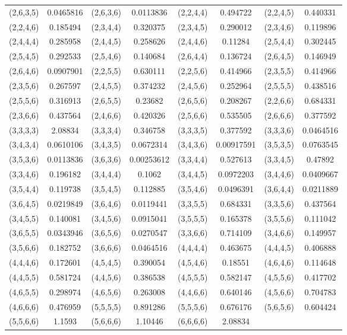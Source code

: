 \documentclass[hidelinks]{ctexart}
\begin{document}
\begin{longtable}{cccccccc}
(2,6,3,5) & 
0.0465816
 & 
(2,6,3,6) & 
0.0113836
 & 
(2,2,4,4) & 
0.494722
 & 
(2,2,4,5) & 
0.440331
\\
(2,2,4,6) & 
0.185494
 & 
(2,3,4,4) & 
0.320375
 & 
(2,3,4,5) & 
0.290012
 & 
(2,3,4,6) & 
0.119896
\\
(2,4,4,4) & 
0.285958
 & 
(2,4,4,5) & 
0.258626
 & 
(2,4,4,6) & 
0.11284
 & 
(2,5,4,4) & 
0.302445
\\
(2,5,4,5) & 
0.292533
 & 
(2,5,4,6) & 
0.140684
 & 
(2,6,4,4) & 
0.136724
 & 
(2,6,4,5) & 
0.146949
\\
(2,6,4,6) & 
0.0907901
 & 
(2,2,5,5) & 
0.630111
 & 
(2,2,5,6) & 
0.414966
 & 
(2,3,5,5) & 
0.414966
\\
(2,3,5,6) & 
0.267597
 & 
(2,4,5,5) & 
0.374232
 & 
(2,4,5,6) & 
0.252964
 & 
(2,5,5,5) & 
0.438516
\\
(2,5,5,6) & 
0.316913
 & 
(2,6,5,5) & 
0.23682
 & 
(2,6,5,6) & 
0.208267
 & 
(2,2,6,6) & 
0.684331
\\
(2,3,6,6) & 
0.437564
 & 
(2,4,6,6) & 
0.420326
 & 
(2,5,6,6) & 
0.535505
 & 
(2,6,6,6) & 
0.377592
\\
(3,3,3,3) & 
2.08834
 & 
(3,3,3,4) & 
0.346758
 & 
(3,3,3,5) & 
0.377592
 & 
(3,3,3,6) & 
0.0464516
\\
(3,4,3,4) & 
0.0610106
 & 
(3,4,3,5) & 
0.0672314
 & 
(3,4,3,6) & 
0.00917591
 & 
(3,5,3,5) & 
0.0763545
\\
(3,5,3,6) & 
0.0113836
 & 
(3,6,3,6) & 
0.00253612
 & 
(3,3,4,4) & 
0.527613
 & 
(3,3,4,5) & 
0.47892
\\
(3,3,4,6) & 
0.196182
 & 
(3,4,4,4) & 
0.1062
 & 
(3,4,4,5) & 
0.0972203
 & 
(3,4,4,6) & 
0.0409667
\\
(3,5,4,4) & 
0.119738
 & 
(3,5,4,5) & 
0.112885
 & 
(3,5,4,6) & 
0.0496391
 & 
(3,6,4,4) & 
0.0211889
\\
(3,6,4,5) & 
0.0219849
 & 
(3,6,4,6) & 
0.0119441
 & 
(3,3,5,5) & 
0.684331
 & 
(3,3,5,6) & 
0.437564
\\
(3,4,5,5) & 
0.140081
 & 
(3,4,5,6) & 
0.0915041
 & 
(3,5,5,5) & 
0.165378
 & 
(3,5,5,6) & 
0.111042
\\
(3,6,5,5) & 
0.0343946
 & 
(3,6,5,6) & 
0.0270547
 & 
(3,3,6,6) & 
0.714109
 & 
(3,4,6,6) & 
0.149957
\\
(3,5,6,6) & 
0.182752
 & 
(3,6,6,6) & 
0.0464516
 & 
(4,4,4,4) & 
0.463675
 & 
(4,4,4,5) & 
0.406888
\\
(4,4,4,6) & 
0.172601
 & 
(4,5,4,5) & 
0.390054
 & 
(4,5,4,6) & 
0.18551
 & 
(4,6,4,6) & 
0.114648
\\
(4,4,5,5) & 
0.581724
 & 
(4,4,5,6) & 
0.386538
 & 
(4,5,5,5) & 
0.582147
 & 
(4,5,5,6) & 
0.417702
\\
(4,6,5,5) & 
0.298974
 & 
(4,6,5,6) & 
0.263008
 & 
(4,4,6,6) & 
0.640146
 & 
(4,5,6,6) & 
0.704783
\\
(4,6,6,6) & 
0.476959
 & 
(5,5,5,5) & 
0.891286
 & 
(5,5,5,6) & 
0.676176
 & 
(5,6,5,6) & 
0.604424
\\
(5,5,6,6) & 
1.1593
 & 
(5,6,6,6) & 
1.10446
 & 
(6,6,6,6) & 
2.08834
 & 
\end{longtable}
\end{document}
